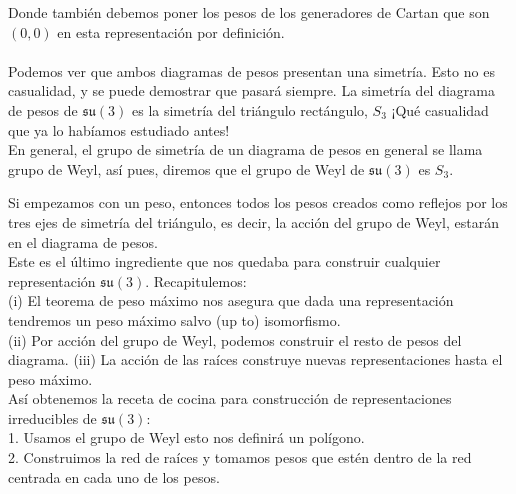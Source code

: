 \documentclass[12pt]{article}
\begin{document}
Donde también debemos poner los pesos de los generadores de Cartan que son $(0,0)$ en esta representación por definición.\\\\
Podemos ver que ambos diagramas de pesos presentan una simetría. Esto no es casualidad, y se puede demostrar que pasará siempre.  La simetría del diagrama de pesos de  $\mathfrak{s}\mathfrak{u}(3)$ es la simetría del triángulo rectángulo, $S_3$ ¡Qué casualidad que ya lo habíamos estudiado antes!\\
En general, el grupo de simetría de un diagrama de pesos en general se llama grupo de Weyl, así pues, diremos que el grupo de Weyl de $\mathfrak{s}\mathfrak{u}(3)$ es $S_3$. \\
\begin{center}
\end{center}
Si empezamos con un peso, entonces todos los pesos creados como reflejos por los tres ejes de simetría del triángulo, es decir, la acción del grupo de Weyl, estarán en el diagrama de pesos. \\ Este es el último ingrediente que nos quedaba para construir cualquier representación $\mathfrak{s}\mathfrak{u}(3)$. Recapitulemos:\\
(i) El teorema de peso máximo nos asegura que dada una representación tendremos un peso máximo salvo (up to) isomorfismo. \\
(ii) Por acción del grupo de Weyl, podemos construir el resto de pesos del diagrama.
(iii) La acción de las raíces construye nuevas representaciones hasta el peso máximo.\\
Así obtenemos la receta de cocina para construcción de representaciones irreducibles de $\mathfrak{s}\mathfrak{u}(3)$:\\
1. Usamos el grupo de Weyl esto nos definirá un polígono.\\
2. Construimos la red de raíces y tomamos pesos que estén dentro de la red centrada en cada uno de los pesos. \\
\end{document}
